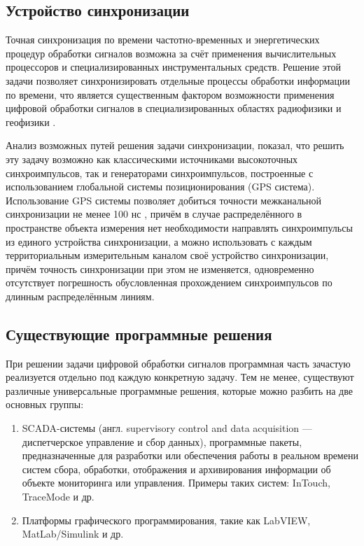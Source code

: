 \documentclass[a4paper, 14pt, titlepage]{extarticle}
\begin{document}
  \subsection{Устройство синхронизации}

  Точная синхронизация по времени частотно-временных и энергетических процедур обработки
  сигналов возможна за счёт применения вычислительных процессоров и специализированных
  инструментальных средств. Решение этой задачи позволяет синхронизировать отдельные процессы
  обработки информации по времени, что является существенным фактором возможности применения
  цифровой обработки сигналов в специализированных областях радиофизики и геофизики \cite{stupin-methods}.

  Анализ возможных путей решения задачи синхронизации, показал, что решить эту задачу возможно как
  классическими источниками высокоточных синхроимпульсов, так и генераторами синхроимпульсов,
  построенные с использованием глобальной системы позиционирования (GPS система). Использование GPS
  системы позволяет добиться точности межканальной синхронизации не менее 100 нс \cite{lombardi-gps}, причём в случае
  распределённого в пространстве объекта измерения нет необходимости направлять синхроимпульсы из
  единого устройства синхронизации, а можно использовать с каждым территориальным измерительным
  каналом своё устройство синхронизации, причём точность синхронизации при этом не изменяется,
  одновременно отсутствует погрешность обусловленная прохождением синхроимпульсов по длинным
  распределённым линиям.

  \subsection{Существующие программные решения}\label{ssec:existing}

  При решении задачи цифровой обработки сигналов программная часть зачастую реализуется отдельно под
  каждую конкретную задачу. %
  Тем не менее, существуют различные универсальные программные решения, которые можно разбить на две
  основных группы:
  \begin{enumerate}
    \item SCADA-системы (англ. supervisory control and data acquisition — диспетчерское управление и
      сбор данных), программные пакеты, предназначенные для разработки или обеспечения работы в
      реальном времени систем сбора, обработки, отображения и архивирования информации об объекте
      мониторинга или управления. %
      Примеры таких систем: InTouch, TraceMode и др. %
    \item Платформы графического программирования, такие как LabVIEW, MatLab/Simulink и др.
  \end{enumerate}
\end{document}
